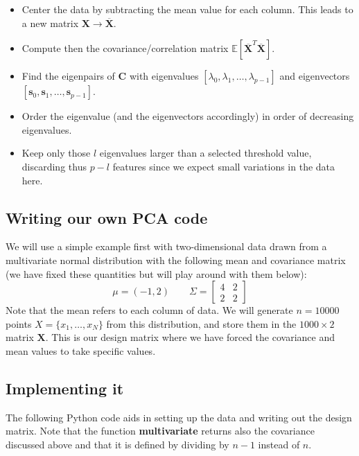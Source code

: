 \documentclass[%
oneside,                 %
final,                   %
10pt]{article}
\begin{document}
\begin{itemize}
\item Center the data by subtracting the mean value for each column. This leads to a new matrix $\bm{X}\rightarrow \overline{\bm{X}}$.

\item Compute then the covariance/correlation matrix $\mathbb{E}[\overline{\bm{X}}^T\overline{\bm{X}}]$.

\item Find the eigenpairs of $\bm{C}$ with eigenvalues $[\lambda_0,\lambda_1,\dots,\lambda_{p-1}]$ and eigenvectors $[\bm{s}_0,\bm{s}_1,\dots,\bm{s}_{p-1}]$.

\item Order the eigenvalue (and the eigenvectors accordingly) in order of decreasing eigenvalues.

\item Keep only those $l$ eigenvalues larger than a selected threshold value, discarding thus $p-l$ features since we expect small variations in the data here.
\end{itemize}

\noindent
\subsection{Writing our own PCA code}

We will use a simple example first with two-dimensional data
drawn from a multivariate normal distribution with the following mean and covariance matrix (we have fixed these quantities but will play around with them below):
\[
\mu = (-1,2) \qquad \Sigma = \begin{bmatrix} 4 & 2 \\
2 & 2
\end{bmatrix}
\]
Note that the mean refers to each column of data. 
We will generate $n = 10000$ points $X = \{ x_1, \ldots, x_N \}$ from
this distribution, and store them in the $1000 \times 2$ matrix $\bm{X}$. This is our design matrix where we have forced the covariance and mean values to take specific values.

\subsection{Implementing it}
The following Python code aids in setting up the data and writing out the design matrix.
Note that the function \textbf{multivariate} returns also the covariance discussed above and that it is defined by dividing by $n-1$ instead of $n$.
\end{document}

